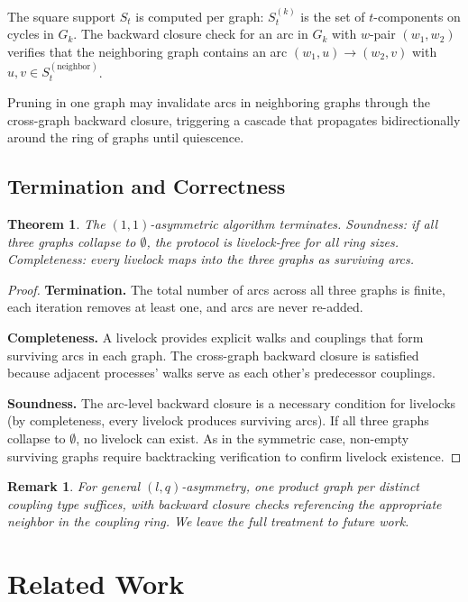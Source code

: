 \documentclass[11pt]{article}
\newtheorem{theorem}{Theorem}
\newtheorem{remark}{Remark}
\begin{document}
The square support $S_t$ is computed per graph: $S_t^{(k)}$ is the set of $t$-components on cycles in $G_k$. The backward closure check for an arc in $G_k$ with $w$-pair $(w_1, w_2)$ verifies that the neighboring graph contains an arc $(w_1, u) \to (w_2, v)$ with $u, v \in S_t^{(\text{neighbor})}$.

Pruning in one graph may invalidate arcs in neighboring graphs through the cross-graph backward closure, triggering a cascade that propagates bidirectionally around the ring of graphs until quiescence.

\subsection{Termination and Correctness}

\begin{theorem}
The $(1,1)$-asymmetric algorithm terminates. Soundness: if all three graphs collapse to $\emptyset$, the protocol is livelock-free for all ring sizes. Completeness: every livelock maps into the three graphs as surviving arcs.
\end{theorem}

\begin{proof}
\textbf{Termination.} The total number of arcs across all three graphs is finite, each iteration removes at least one, and arcs are never re-added.

\textbf{Completeness.} A livelock provides explicit walks and couplings that form surviving arcs in each graph. The cross-graph backward closure is satisfied because adjacent processes' walks serve as each other's predecessor couplings.

\textbf{Soundness.} The arc-level backward closure is a necessary condition for livelocks (by completeness, every livelock produces surviving arcs). If all three graphs collapse to $\emptyset$, no livelock can exist. As in the symmetric case, non-empty surviving graphs require backtracking verification to confirm livelock existence.
\end{proof}

\begin{remark}
For general $(l,q)$-asymmetry, one product graph per distinct coupling type suffices, with backward closure checks referencing the appropriate neighbor in the coupling ring. We leave the full treatment to future work.
\end{remark}

\section{Related Work}
\label{sec:related}
\end{document}
